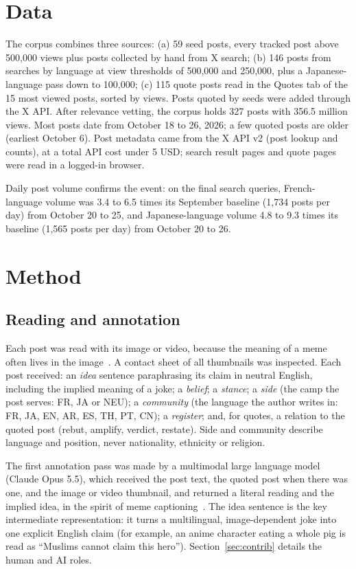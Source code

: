 \documentclass[10pt,a4paper]{article}
\begin{document}
\section{Data}
The corpus combines three sources: (a) 59 seed posts, every tracked post above 500,000 views plus posts collected by hand from X search; (b) 146 posts from searches by language at view thresholds of 500,000 and 250,000, plus a Japanese-language pass down to 100,000; (c) 115 quote posts read in the Quotes tab of the 15 most viewed posts, sorted by views. Posts quoted by seeds were added through the X API. After relevance vetting, the corpus holds 327 posts with 356.5 million views. Most posts date from October 18 to 26, 2026; a few quoted posts are older (earliest October 6). Post metadata came from the X API v2 (post lookup and counts), at a total API cost under 5 USD; search result pages and quote pages were read in a logged-in browser.

Daily post volume confirms the event: on the final search queries, French-language volume was 3.4 to 6.5 times its September baseline (1,734 posts per day) from October 20 to 25, and Japanese-language volume 4.8 to 9.3 times its baseline (1,565 posts per day) from October 20 to 26.

\section{Method}
\subsection{Reading and annotation}
Each post was read with its image or video, because the meaning of a meme often lives in the image~\cite{memecap}. A contact sheet of all thumbnails was inspected. Each post received: an \emph{idea} sentence paraphrasing its claim in neutral English, including the implied meaning of a joke; a \emph{belief}; a \emph{stance}; a \emph{side} (the camp the post serves: FR, JA or NEU); a \emph{community} (the language the author writes in: FR, JA, EN, AR, ES, TH, PT, CN); a \emph{register}; and, for quotes, a relation to the quoted post (rebut, amplify, verdict, restate). Side and community describe language and position, never nationality, ethnicity or religion.

The first annotation pass was made by a multimodal large language model (Claude Opus 5.5), which received the post text, the quoted post when there was one, and the image or video thumbnail, and returned a literal reading and the implied idea, in the spirit of meme captioning~\cite{memecap}. The idea sentence is the key intermediate representation: it turns a multilingual, image-dependent joke into one explicit English claim (for example, an anime character eating a whole pig is read as ``Muslims cannot claim this hero''). Section~\ref{sec:contrib} details the human and AI roles.
\end{document}
